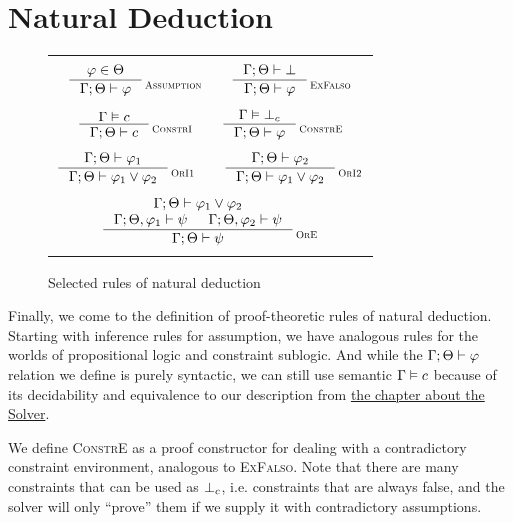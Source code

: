\documentclass[english, mgr]{iithesis}
\renewcommand{\sc}[1]{\textsc{\small{#1}}}
\newcommand{\scbrk}[2]{\myatop{\textsc{#1}}{\textsc{#2}}}
\begin{document}
\section{Natural Deduction}
\begin{figure}[htbp]
  \centering
  \begin{tabularx}{\textwidth}{|C|}
  \hline \\ $
  \inference{
    \formphi \in \Theta
  }{
    \jgmnt[\cEnv;\Theta]{\formphi}
  }\scbrk{}{Assumption}
  \qquad
  \inference{
    \jgmnt[\cEnv;\Theta]{\bot}
  }{
    \jgmnt[\cEnv;\Theta]{\formphi}
  }\scbrk{}{ExFalso}
  $ \\ \\ $
  \inference{
    \cjgmnt[\cEnv]{\constr}
  }{
    \jgmnt[\cEnv;\Theta]{\constr}
  }\scbrk{}{ConstrI}
  \qquad
  \inference{
    \cjgmnt[\cEnv]{\bot_\constr}
    }{
    \jgmnt[\cEnv;\Theta]{\formphi}
  }\scbrk{}{ConstrE}
  $ \\ \\ $
  \inference{
    \jgmnt[\cEnv;\Theta]{\formphi_1}
    }{
    \jgmnt[\cEnv;\Theta]{\formphi_1 \vee \formphi_2}
  }\scbrk{}{OrI1}
  \qquad
  \inference{
    \jgmnt[\cEnv;\Theta]{\formphi_2}
  }{
    \jgmnt[\cEnv;\Theta]{\formphi_1 \vee \formphi_2}
  }\scbrk{}{OrI2}
  $ \\ \\ $
  \inference{
    \jgmnt[\cEnv;\Theta]{\formphi_1 \vee \formphi_2} \\
    \jgmnt[\cEnv;\Theta,\formphi_1]{\psi} &
    \jgmnt[\cEnv;\Theta,\formphi_2]{\psi}
  }{
    \jgmnt[\cEnv;\Theta]{\psi}
  }\scbrk{}{OrE}
  $ \\ \\ \hline
  \end{tabularx}
  \caption{Selected rules of natural deduction}
  \label{fig:deduction}
\end{figure}
Finally, we come to the definition of proof-theoretic rules of natural deduction.
Starting with inference rules for assumption,
we have analogous rules for the worlds of propositional logic
and constraint sublogic.
And while the $\jgmnt[\cEnv;\Theta]{\formphi}$ relation we define is purely syntactic,
we can still use semantic $\cjgmnt[\cEnv]{\constr}$ because of its decidability and equivalence
to our description from \hyperref[sec:solver]{the chapter about the Solver}.

We define \sc{ConstrE} as a proof constructor for dealing with a contradictory
constraint environment, analogous to \sc{ExFalso}.
Note that there are many constraints that can be used as $\bot_c$, i.e.
constraints that are always false, and the solver will only ``prove'' them
if we supply it with contradictory assumptions.
\end{document}
